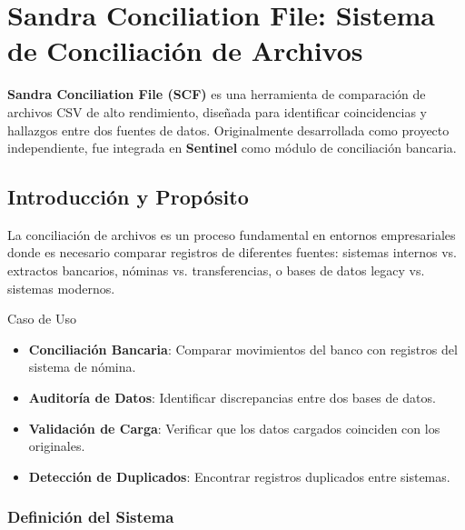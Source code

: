 \chapter{Sandra Conciliation File: Sistema de Conciliación de Archivos}

\textbf{Sandra Conciliation File (SCF)} es una herramienta de comparación de archivos CSV de alto rendimiento, diseñada para identificar coincidencias y hallazgos entre dos fuentes de datos. Originalmente desarrollada como proyecto independiente, fue integrada en \textbf{Sentinel} como módulo de conciliación bancaria.


\section{Introducción y Propósito}

La conciliación de archivos es un proceso fundamental en entornos empresariales donde es necesario comparar registros de diferentes fuentes: sistemas internos vs. extractos bancarios, nóminas vs. transferencias, o bases de datos legacy vs. sistemas modernos.

\begin{caja}{Caso de Uso}
\begin{itemize}
\item \textbf{Conciliación Bancaria}: Comparar movimientos del banco con registros del sistema de nómina.
\item \textbf{Auditoría de Datos}: Identificar discrepancias entre dos bases de datos.
\item \textbf{Validación de Carga}: Verificar que los datos cargados coinciden con los originales.
\item \textbf{Detección de Duplicados}: Encontrar registros duplicados entre sistemas.
\end{itemize}
\end{caja}


\subsection{Definición del Sistema}

